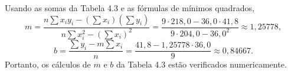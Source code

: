 Usando as somas da Tabela 4.3 e as fórmulas de mínimos quadrados,
\[
m = \frac{n\sum x_i y_i - (\sum x_i)(\sum y_i)}{n\sum x_i^{2} - (\sum x_i)^{2}}
= \frac{9\cdot218{,}0 - 36{,}0\cdot41{,}8}{9\cdot204{,}0 - 36{,}0^{2}}
\approx 1{,}25778,
\]
\[
b = \frac{\sum y_i - m\sum x_i}{n}
= \frac{41{,}8 - 1{,}25778\cdot36{,}0}{9}
\approx 0{,}84667.
\]
Portanto, os cálculos de $m$ e $b$ da Tabela 4.3 estão verificados numericamente.  